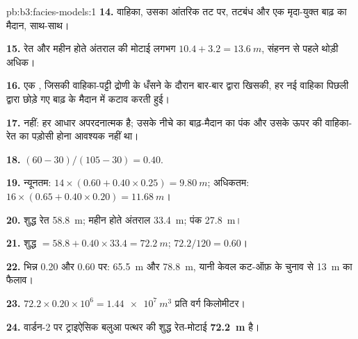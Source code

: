 \begin{solution}{pb:b3:facies-models:1}
\textbf{14.} वाहिका, उसका  आंतरिक तट पर, तटबंध और एक
मृदा-युक्त बाढ़ का मैदान, साथ-साथ।

\textbf{15.} रेत और महीन होते अंतराल की मोटाई लगभग $10.4 + 3.2 =
\qty{13.6}{m}$, संहनन से पहले थोड़ी अधिक।

\textbf{16.} एक , जिसकी वाहिका-पट्टी द्रोणी के धँसने के दौरान
बार-बार  द्वारा खिसकी, हर नई वाहिका
पिछली द्वारा छोड़े गए बाढ़ के मैदान में कटाव करती हुई।

\textbf{17.} नहीं: हर आधार अपरदनात्मक है; उसके नीचे का बाढ़-मैदान का पंक और
उसके ऊपर की वाहिका-रेत का पड़ोसी होना आवश्यक नहीं था।

\textbf{18.} $(60 - 30)/(105 - 30) = 0.40$.

\textbf{19.} न्यूनतम: $14\times(0.60 + 0.40\times0.25) = \qty{9.80}{m}$;
अधिकतम: $16\times(0.65 + 0.40\times0.20) = \qty{11.68}{m}$।

\textbf{20.} शुद्ध रेत \qty{58.8}{m}; महीन होते अंतराल \qty{33.4}{m}; पंक
\qty{27.8}{m}।

\textbf{21.} शुद्ध $= 58.8 + 0.40\times33.4 = \qty{72.2}{m}$;  $72.2/120 = 0.60$।

\textbf{22.} भिन्न 0.20 और 0.60 पर: \qty{65.5}{m} और \qty{78.8}{m}, यानी
केवल कट-ऑफ़ के चुनाव से \qty{13}{m} का फैलाव।

\textbf{23.} $72.2\times0.20\times10^6 = \qty{1.44e7}{m^3}$ प्रति वर्ग
किलोमीटर।

\textbf{24.} वार्डन-2 पर ट्राइऐसिक बलुआ पत्थर की शुद्ध रेत-मोटाई
\textbf{\qty[text-series-to-math=true]{72.2}{m}} है।
\end{solution}
